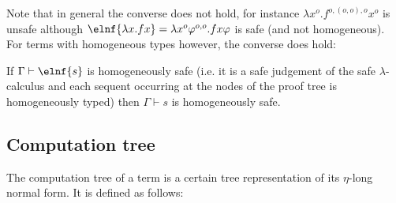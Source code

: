 Note that in general the converse does not hold, for instance $\lambda x^o . f^{o,(o,o),o} x^o$ is unsafe although $\elnf{\lambda x . f x} = \lambda x^o \varphi^{o,o} . f x \varphi$ is safe (and not homogeneous). For terms with homogeneous types however, the converse does hold:
\begin{lemma}
If $\Gamma \vdash \elnf{s}$ is homogeneously safe (i.e. it is a safe judgement of the safe $\lambda$-calculus and each sequent occurring at the nodes of the proof tree is homogeneously typed) then
$\Gamma \vdash s$ is homogeneously safe.
\end{lemma}


\subsection{Computation tree}
The computation tree of a term is a certain tree representation of its
$\eta$-long normal form. It is defined as follows:

